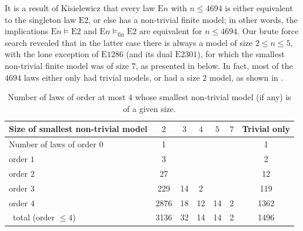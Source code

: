 \documentclass[12pt]{amsart}
\theoremstyle{definition}
\newcommand{\modelsfin}{\models_{\mathrm{fin}}}
\newcommand{\Eq}[1]{\mathrm{E}#1}
\begin{document}
It is a result of Kisielewicz \cite{Kisielewicz} that every law $\Eq{n}$ with $n \leq 4694$ is either equivalent to the singleton law $\Eq{2}$, or else has a non-trivial finite model; in other words, the implications $\Eq{n} \models \Eq{2}$ and $\Eq{n} \modelsfin \Eq{2}$ are equivalent for $n \leq 4694$.  Our brute force search revealed that in the latter case there is always a model of size $2 \leq n \leq 5$, with the lone exception of $\Eq{1286}$ (and its dual $\Eq{2301}$), for which the smallest non-trivial finite model was of size $7$, as presented in  below.  In fact, most of the $\num{4694}$ laws either only had trivial models, or had a size $2$ model, as shown in .
\begin{table}
\centering
\caption{Number of laws of order at most $4$ whose smallest non-trivial model (if any) is of a given size.}\label{size-table}
\begin{tabular}{lS[table-format=4]SSSS[table-format=1]S[table-format=4]}
  \toprule
  Size of smallest non-trivial model & {$2$} & {$3$} & {$4$} & {$5$} & {$7$} & {Trivial only} \\
  \midrule
  Number of laws of order $0$ & 1 & & & & & 1 \\
  \phantom{Number of laws of }order $1$ & 3 & & & & & 2 \\
  \phantom{Number of laws of }order $2$ & 27 & & & & & 12 \\
  \phantom{Number of laws of }order $3$ & 229 & 14 & 2 & & & 119 \\
  \phantom{Number of laws of }order $4$ & 2876 & 18 & 12 & 14 & 2 & 1362 \\
  \qquad\qquad\, total (order $\leq 4$) & 3136 & 32 & 14 & 14 & 2 & 1496 \\
  \bottomrule
\end{tabular}
\end{table}
\end{document}
